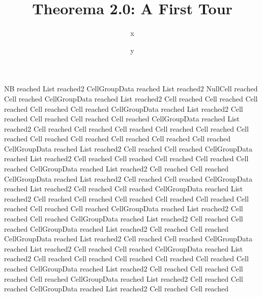 \documentclass{article}
\begin{document}
\title{Theorema 2.0: A First Tour}
\author{x}
\date{y}
\maketitle

% 

NB reached List reached2 CellGroupData reached List reached2 NullCell reached Cell reached CellGroupData reached List reached2 Cell reached Cell reached Cell reached Cell reached Cell reached CellGroupData reached List reached2 Cell reached Cell reached Cell reached Cell reached CellGroupData reached List reached2 Cell reached Cell reached Cell reached Cell reached Cell reached Cell reached Cell reached Cell reached Cell reached Cell reached Cell reached CellGroupData reached List reached2 Cell reached Cell reached CellGroupData reached List reached2 Cell reached Cell reached Cell reached Cell reached Cell reached CellGroupData reached List reached2 Cell reached Cell reached CellGroupData reached List reached2 Cell reached Cell reached CellGroupData reached List reached2 Cell reached Cell reached CellGroupData reached List reached2 Cell reached Cell reached Cell reached Cell reached Cell reached Cell reached Cell reached Cell reached CellGroupData reached List reached2 Cell reached Cell reached CellGroupData reached List reached2 Cell reached Cell reached CellGroupData reached List reached2 Cell reached Cell reached CellGroupData reached List reached2 Cell reached Cell reached CellGroupData reached List reached2 Cell reached Cell reached CellGroupData reached List reached2 Cell reached Cell reached Cell reached Cell reached Cell reached Cell reached CellGroupData reached List reached2 Cell reached Cell reached Cell reached Cell reached CellGroupData reached List reached2 Cell reached Cell reached CellGroupData reached List reached2 Cell reached Cell reached 
\end{document}
